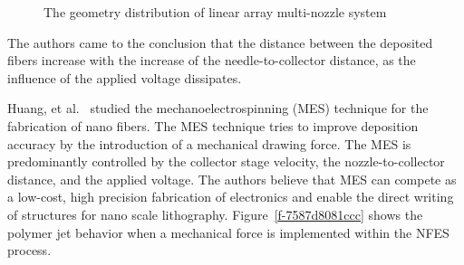 \documentclass[5p,,preprint,12pt,twocolumn]{elsarticle}
\makeatletter
\def\fixFloatSize#1{}%
\makeatother
\begin{document}
\bgroup
\fixFloatSize{images/cd8e0617-d4d9-479b-a99b-a466cd21483c-uwang_01.png}
\begin{figure}[!htbp]
\centering \makeatletter{}
\makeatother 
\caption{{The geometry distribution of linear array multi-nozzle system \unskip~\protect\cite{527120:11974323}}}
\label{f-4a1a1f58a423}
\end{figure}
\egroup
The authors came to the conclusion that the distance between the deposited fibers increase with the increase of the needle-to-collector distance, as the influence of the applied voltage dissipates.

Huang, et al.\unskip~\cite{527120:11974311} studied the mechanoelectrospinning (MES) technique for the fabrication of nano fibers. The MES technique tries to improve deposition accuracy by the introduction of a mechanical drawing force. The MES is predominantly controlled by the collector stage velocity, the nozzle-to-collector distance, and the applied voltage. The authors believe that MES can compete as a low-cost, high precision fabrication of electronics and enable the direct writing of structures for nano scale lithography. Figure~\ref{f-7587d8081ccc} shows the polymer jet behavior when a mechanical force is implemented within the NFES process.
\end{document}
